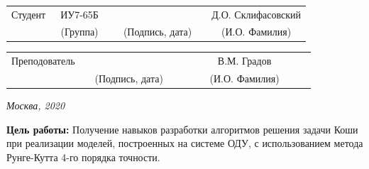 \documentclass[14pt, a4paper]{extarticle}
\begin{document}
\noindent
{}
\\
\\


\noindent
{}
\\

\vspace{1.5cm}
\noindent
\begin{tabular}{l c c c c c}
	Студент      & ~ИУ7-65Б~               & \hspace{2.5cm} & \hspace{2cm}                 & &  Д.О. Склифасовский \\\cline{2-2}\cline{4-4} \cline{6-6} 
	\hspace{3cm} & {\footnotesize(Группа)} &                & {\footnotesize(Подпись, дата)} & & {\footnotesize(И.О. Фамилия)}
\end{tabular}

\noindent
\begin{tabular}{l c c c c}
	Преподователь & \hspace{5cm}   & \hspace{2cm}                 & & ~~~~~~~В.М. Градов~~~~~~~\\\cline{3-3} \cline{5-5} 
	\hspace{3cm}  &                & {\footnotesize(Подпись, дата)} & & {\footnotesize(И.О. Фамилия)}
\end{tabular}

\vspace{0.6cm}
\begin{center}	
	\vfill
	\large \textit {Москва, 2020}
\end{center}

\thispagestyle {empty}
\pagebreak

\clearpage
\textbf{Цель работы:} Получение навыков разработки алгоритмов решения задачи Коши при реализации моделей, построенных на системе ОДУ, с использованием метода Рунге-Кутта 4-го порядка точности.\par
\end{document}
